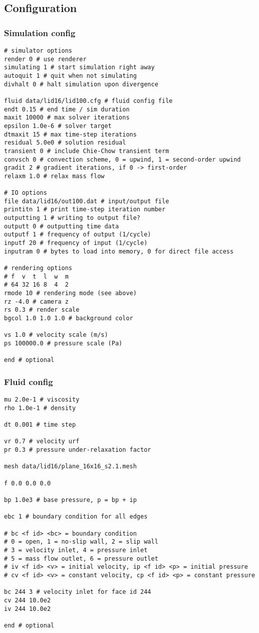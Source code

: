 \documentclass[12pt]{article}
\begin{document}
\subsection{Configuration}

\subsubsection{Simulation config}

\begin{verbatim}
# simulator options
render 0 # use renderer
simulating 1 # start simulation right away
autoquit 1 # quit when not simulating
divhalt 0 # halt simulation upon divergence

fluid data/lid16/lid100.cfg # fluid config file
endt 0.15 # end time / sim duration
maxit 10000 # max solver iterations
epsilon 1.0e-6 # solver target
dtmaxit 15 # max time-step iterations
residual 5.0e0 # solution residual
transient 0 # include Chie-Chow transient term
convsch 0 # convection scheme, 0 = upwind, 1 = second-order upwind
gradit 2 # gradient iterations, if 0 -> first-order
relaxm 1.0 # relax mass flow

# IO options
file data/lid16/out100.dat # input/output file
printitn 1 # print time-step iteration number
outputting 1 # writing to output file?
outputt 0 # outputting time data
outputf 1 # frequency of output (1/cycle)
inputf 20 # frequency of input (1/cycle)
inputram 0 # bytes to load into memory, 0 for direct file access

# rendering options
# f  v  t  l  w  m
# 64 32 16 8  4  2
rmode 10 # rendering mode (see above)
rz -4.0 # camera z
rs 0.3 # render scale
bgcol 1.0 1.0 1.0 # background color

vs 1.0 # velocity scale (m/s)
ps 100000.0 # pressure scale (Pa)

end # optional
\end{verbatim}

\subsubsection{Fluid config}

\begin{verbatim}
mu 2.0e-1 # viscosity
rho 1.0e-1 # density

dt 0.001 # time step

vr 0.7 # velocity urf
pr 0.3 # pressure under-relaxation factor

mesh data/lid16/plane_16x16_s2.1.mesh

f 0.0 0.0 0.0

bp 1.0e3 # base pressure, p = bp + ip

ebc 1 # boundary condition for all edges

# bc <f id> <bc> = boundary condition
# 0 = open, 1 = no-slip wall, 2 = slip wall
# 3 = velocity inlet, 4 = pressure inlet
# 5 = mass flow outlet, 6 = pressure outlet
# iv <f id> <v> = initial velocity, ip <f id> <p> = initial pressure
# cv <f id> <v> = constant velocity, cp <f id> <p> = constant pressure

bc 244 3 # velocity inlet for face id 244
cv 244 10.0e2
iv 244 10.0e2

end # optional
\end{verbatim}
\end{document}
